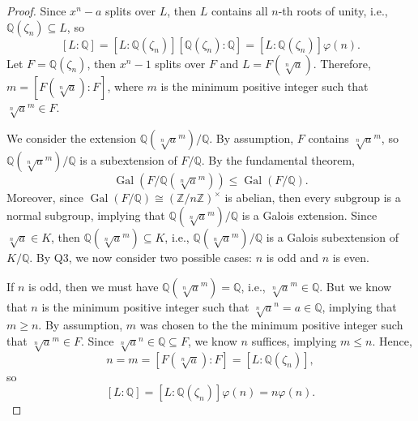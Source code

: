 \documentclass[12pt]{article}
\newcommand{\Z}{\mathbb{Z}}
\newcommand{\Q}{\mathbb{Q}}
\renewcommand{\phi}{\varphi}
\newcommand{\<}{\langle}
\renewcommand{\>}{\rangle}
\newcommand{\isom}{\cong}
\DeclareMathOperator{\Gal}{Gal}
\begin{document}
\begin{proof}
    Since $x^n - a$ splits over $L$, then $L$ contains all $n$-th roots of unity, i.e., $\Q(\zeta_n) \subseteq L$, so
    \[
        [L : \Q] = [L : \Q(\zeta_n)][\Q(\zeta_n) : \Q] = [L : \Q(\zeta_n)]\phi(n).
    \]
    Let $F = \Q(\zeta_n)$, then $x^n - 1$ splits over $F$ and $L = F(\sqrt[n]{a})$. Therefore, $m = [F(\sqrt[n]{a}) : F]$, where $m$ is the minimum positive integer such that $\sqrt[n]{a}^m \in F$. 

    We consider the extension $\Q(\sqrt[n]{a}^m)/\Q$. By assumption, $F$ contains $\sqrt[n]{a}^m$, so $\Q(\sqrt[n]{a}^m)/\Q$ is a subextension of $F/\Q$. By the fundamental theorem,
    \[
        \Gal(F/\Q(\sqrt[n]{a}^m)) \leq \Gal(F/\Q).
    \]
    Moreover, since $\Gal(F/\Q) \isom (\Z/n\Z)^\times$ is abelian, then every subgroup is a normal subgroup, implying that $\Q(\sqrt[n]{a}^m)/\Q$ is a Galois extension. Since $\sqrt[n]{a} \in K$, then $\Q(\sqrt[n]{a}^m) \subseteq K$, i.e., $\Q(\sqrt[n]{a}^m)/\Q$ is a Galois subextension of $K/\Q$. By Q3, we now consider two possible cases: $n$ is odd and $n$ is even.

    If $n$ is odd, then we must have $\Q(\sqrt[n]{a}^m) = \Q$, i.e., $\sqrt[n]{a}^m \in \Q$. But we know that $n$ is the minimum positive integer such that $\sqrt[n]{a}^n = a \in \Q$, implying that $m \geq n$. By assumption, $m$ was chosen to the the minimum positive integer such that $\sqrt[n]{a}^m \in F$. Since $\sqrt[n]{a}^n \in \Q \subseteq F$, we know $n$ suffices, implying $m \leq n$. Hence,
    \[
        n 
            = m
            = [F(\sqrt[n]{a}) : F] 
            = [L : \Q(\zeta_n)],
    \]
    so
    \[
        [L : \Q] 
            = [L : \Q(\zeta_n)]\phi(n) 
            = n \phi(n).
    \]


\end{proof}
\end{document}
